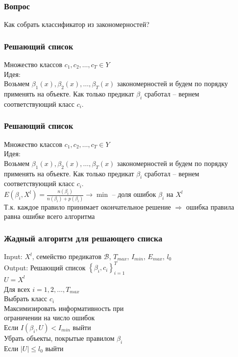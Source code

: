 \documentclass[12pt]{beamer}
\begin{document}
\begin{frame}\frametitle{Вопрос}
Как собрать классификатор из закономерностей?
\end{frame}

\begin{frame}\frametitle{Решающий список}
Множество классов $c_1,c_2,\dots, c_T \in Y$\\
\vspace{5mm}
Идея:\\
Возьмем $\beta_1(x), \beta_2(x), \dots, \beta_T(x)$ закономерностей и будем по порядку применять на объекте. 
Как только предикат $\beta_i$ сработал -- вернем соответствующий класс $c_i$.
\end{frame}

\begin{frame}\frametitle{Решающий список}
Множество классов $c_1,c_2,\dots, c_T \in Y$\\
\vspace{5mm}
Идея:\\
Возьмем $\beta_1(x), \beta_2(x), \dots, \beta_T(x)$ закономерностей и будем по порядку применять на объекте. 
Как только предикат $\beta_i$ сработал -- вернем соответствующий класс $c_i$.\\
\vspace{5mm}
$E(\beta_i, X^l) = \frac{n(\beta_i)}{n(\beta_i)+p(\beta_i)} \rightarrow \min$ -- доля ошибок $\beta_i$ на $X^l$\\
\vspace{5mm}
Т.к. каждое правило принимает окончательное решение $\Rightarrow$ ошибка правила равна ошибке всего алгоритма
\end{frame}

\begin{frame}\frametitle{Жадный алгоритм для решающего списка}
Input: $X^l$, семейство предикатов $\mathcal{B}$, $T_{max}$, $I_{min}$, $E_{max}$, $l_0$\\
Output: Решающий список $\left\{ \beta_i, c_i \right\}_{i=1}^T$\\
\vspace{5mm}
$U = X^l$\\
Для всех $i = 1,2,\dots,T_{max}$\\
\hspace{10mm} Выбрать класс $c_i$\\
\hspace{10mm} Максимизировать информативность при \\
\hspace{40mm} ограничении на число ошибок\\
\hspace{10mm} Если $I(\beta_i, U) < I_{min}$ выйти\\
\hspace{10mm} Убрать объекты, покрытые правилом $\beta_i$\\
\hspace{10mm} Если $\vert U \vert \leq l_0$ выйти
\end{frame}
\end{document}
